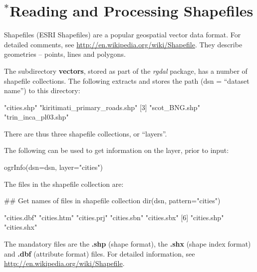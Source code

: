 {\small
\section{$^*$Reading and Processing Shapefiles}
Shapefiles (ESRI Shapefiles) are a popular geospatial vector data
format.  For detailed comments, see
\url{http://en.wikipedia.org/wiki/Shapefile}.  They describe
geometries -- points, lines and polygons.

The subdirectory {\bf vectors}, stored as part of the {\em rgdal}
package, has a number of shapefile collections.  The following
extracts and stores the path (dsn = ``dataset name'') to this
directory:
\begin{Schunk}
\begin{Soutput}
[1] "cities.shp"                   "kiritimati_primary_roads.shp"
[3] "scot_BNG.shp"                 "trin_inca_pl03.shp"          
\end{Soutput}
\end{Schunk}
\noindent
There are thus three shapefile collections, or ``layers''.
\begin{marginfigure}
  The following can be used to get information on the 
layer, prior to input:
\begin{Schunk}
\begin{Sinput}
ogrInfo(dsn=dsn,
        layer="cities")
\end{Sinput}
\end{Schunk}
\end{marginfigure}

The files in the  shapefile collection are:
\begin{Schunk}
\begin{Sinput}
## Get names of files in shapefile collection
dir(dsn, pattern="cities")
\end{Sinput}
\begin{Soutput}
[1] "cities.dbf" "cities.htm" "cities.prj" "cities.sbn" "cities.sbx"
[6] "cities.shp" "cities.shx"
\end{Soutput}
\end{Schunk}
The mandatory files are the {\bf .shp} (shape format), the {\bf .shx}
(shape index format) and {\bf .dbf} (attribute format) files.  For
  detailed information, see
  \url{http://en.wikipedia.org/wiki/Shapefile}.

}
